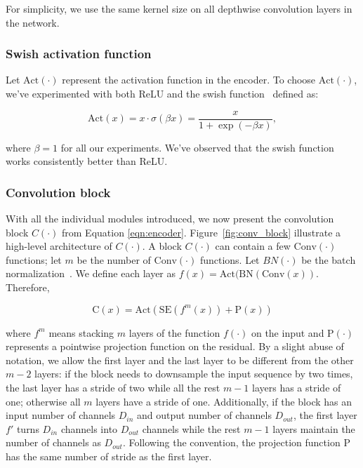 \documentclass[a4paper]{article}
\begin{document}
For simplicity, we use the same kernel size on all depthwise convolution layers in the network.

\vspace{-0.05in}
\subsubsection{Swish activation function}
\vspace{-0.05in}
Let $\mathrm{Act}(\cdot)$ represent the activation function in the encoder. To choose $\mathrm{Act}(\cdot)$, we've experimented with both ReLU and the swish function~\cite{ramachandran2017searching} defined as:
\begin{small}
\begin{equation}
\mathrm{Act}(x)=x\cdot \sigma(\beta x)=\frac{x}{1+\exp{\left(-\beta x\right)}},
\label{eq:swish}
\end{equation}
\end{small}
where $\beta=1$ for all our experiments. We've observed that the swish function works consistently better than ReLU.  
\vspace{-0.05in}
\subsubsection{Convolution block}
\vspace{-0.02in}
With all the individual modules introduced, we now present the convolution block $C(\cdot)$ from Equation \eqref{eqn:encoder}. Figure~\ref{fig:conv_block} illustrate a high-level architecture of $C(\cdot)$. A block $C(\cdot)$ can contain a few $\mathrm{Conv}(\cdot)$ functions; let $m$ be the number of $\mathrm{Conv}(\cdot)$ functions. Let $BN(\cdot)$ be the batch normalization~\cite{ioffe2015batch}. We define each layer as $f(x)=\mathrm{Act}(\mathrm{BN}(\mathrm{Conv}(x))$. Therefore, 

\begin{small}
\begin{equation*}
\mathrm{C}(x) = \mathrm{Act}\left(\mathrm{SE}\left(f^m(x)\right) + \mathrm{P}(x)\right)
\end{equation*}
\end{small} where $f^m$ means stacking $m$ layers of the function $f(\cdot)$ on the input and $\mathrm{P}(\cdot)$ represents a pointwise projection function on the residual. By a slight abuse of notation, we allow the first layer and the last layer to be different from the other $m-2$ layers: if the block needs to downsample the input sequence by two times, the last layer has a stride of two while all the rest $m-1$ layers has a stride of one; otherwise all $m$ layers have a stride of one. Additionally, if the block has an input number of channels $D_{in}$ and output number of channels $D_{out}$, the first layer $f'$ turns $D_{in}$ channels into $D_{out}$ channels while the rest $m-1$ layers maintain the number of channels as $D_{out}$. Following the convention, the projection function $\mathrm{P}$ has the same number of stride as the first layer.
\end{document}
